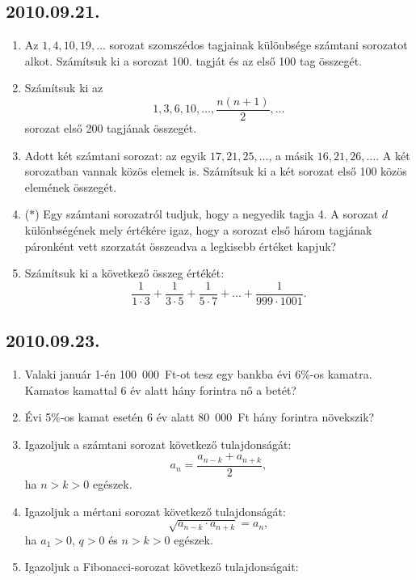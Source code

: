 \subsection*{2010.09.21.}
\begin{enumerate}
\item Az $1,4,10,19,\ldots$ sorozat szomszédos tagjainak különbsége számtani sorozatot alkot. Számítsuk ki a sorozat 100. tagját és az első 100 tag összegét.
\item Számítsuk ki az
$$1,3,6,10,\ldots,\frac{n(n+1)}{2},\ldots$$
sorozat első 200 tagjának összegét.
\item Adott két számtani sorozat: az egyik
$17,21,25,\ldots$, a másik $16,21,26,\ldots$. A két sorozatban vannak közös elemek is. Számítsuk ki a két sorozat első 100 közös elemének összegét.
\item ($*$) Egy számtani sorozatról tudjuk, hogy a negyedik tagja 4. A sorozat $d$ különbségének mely értékére igaz, hogy a sorozat első három tagjának páronként vett szorzatát összeadva a legkisebb értéket kapjuk?
\item Számítsuk ki a következő összeg értékét:
$$\frac{1}{1\cdot 3}+\frac{1}{3\cdot 5}
+\frac{1}{5\cdot 7}+\ldots+\frac{1}{999\cdot 1001}.$$
\end{enumerate}


\subsection*{2010.09.23.}
\begin{enumerate}
\item Valaki január 1-én 100~000~Ft-ot tesz egy bankba évi 6\%-os kamatra. Kamatos kamattal 6 év alatt hány forintra nő a betét?
\item Évi 5\%-os kamat esetén 6 év alatt 80~000~Ft hány forintra növekszik?
\item Igazoljuk a számtani sorozat következő tulajdonságát:
$$a_n=\frac{a_{n-k}+a_{n+k}}{2},$$
ha $n>k>0$ egészek.
\item Igazoljuk a mértani sorozat következő tulajdonságát:
$$\sqrt{a_{n-k}\cdot a_{n+k}}=a_n,$$
ha $a_1>0$, $q>0$ és $n>k>0$ egészek.
\item Igazoljuk a Fibonacci-sorozat következő tulajdonságait:
\end{enumerate}


